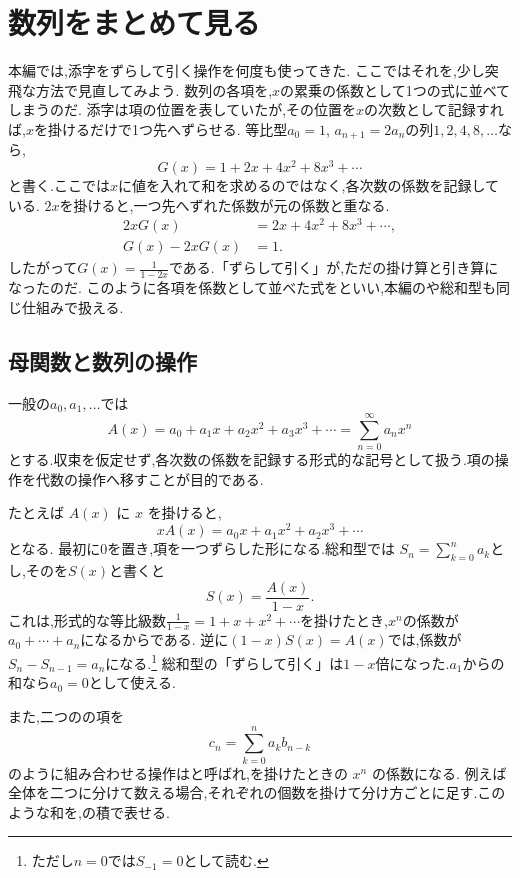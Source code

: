 
\section{数列をまとめて見る}\label{節：数列をまとめて見る}

本編では,添字をずらして引く操作を何度も使ってきた.
ここではそれを,少し突飛な方法で見直してみよう.
数列の各項を,$x$の累乗の係数として1つの式に並べてしまうのだ.
添字は項の位置を表していたが,その位置を$x$の次数として記録すれば,$x$を掛けるだけで1つ先へずらせる.
等比型$a_0=1$, $a_{n+1}=2a_n$の列$1,2,4,8,\ldots$なら,
\[
  G(x)=1+2x+4x^2+8x^3+\cdots
\]
と書く.ここでは$x$に値を入れて和を求めるのではなく,各次数の係数を記録している.
$2x$を掛けると,一つ先へずれた係数が元の係数と重なる.
\[
  \begin{aligned}
    2xG(x)&=2x+4x^2+8x^3+\cdots,\\
    G(x)-2xG(x)&=1.
  \end{aligned}
\]
したがって$G(x)=\frac{1}{1-2x}$である.「ずらして引く」が,ただの掛け算と引き算になったのだ.
このように各項を係数として並べた式をといい,本編のや総和型も同じ仕組みで扱える.

\subsection{母関数と数列の操作}
一般の$a_0,a_1,\ldots$では
\[
  A(x)=a_0+a_1x+a_2x^2+a_3x^3+\cdots
  =\sum_{n=0}^{\infty}a_nx^n
\]
とする.収束を仮定せず,各次数の係数を記録する形式的な記号として扱う.項の操作を代数の操作へ移すことが目的である.

たとえば $A(x)$ に $x$ を掛けると,
\[
  xA(x)=a_0x+a_1x^2+a_2x^3+\cdots
\]
となる.
最初に$0$を置き,項を一つずらした形になる.総和型では
$S_n=\sum_{k=0}^n a_k$とし,そのを$S(x)$と書くと
\[
  S(x)=\frac{A(x)}{1-x}.
\]
これは,形式的な等比級数$\frac{1}{1-x}=1+x+x^2+\cdots$を掛けたとき,$x^n$の係数が$a_0+\cdots+a_n$になるからである.
逆に$(1-x)S(x)=A(x)$では,係数が$S_n-S_{n-1}=a_n$になる.\footnote{ただし$n=0$では$S_{-1}=0$として読む.}
総和型の「ずらして引く」は$1-x$倍になった.$a_1$からの和なら$a_0=0$として使える.

また,二つのの項を
\[
  c_n=\sum_{k=0}^{n}a_kb_{n-k}
\]
のように組み合わせる操作はと呼ばれ,を掛けたときの $x^n$ の係数になる.
例えば全体を二つに分けて数える場合,それぞれの個数を掛けて分け方ごとに足す.このような和を,の積で表せる.

